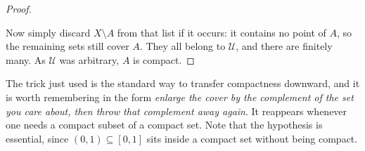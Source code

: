 \begin{proof}
\begin{center}
\end{center}

Now simply discard $X\setminus A$ from that list if it occurs: it contains no point of $A$, so
the remaining sets still cover $A$. They all belong to $\mathcal{U}$, and there are finitely
many. As $\mathcal{U}$ was arbitrary, $A$ is compact.
\end{proof}

\begin{remark}
The trick just used is the standard way to transfer compactness downward, and it is worth
remembering in the form \emph{enlarge the cover by the complement of the set you care about, then
throw that complement away again}. It reappears whenever one needs a compact subset of a compact
set. Note that the hypothesis  is essential, since $(0,1) \subseteq [0,1]$ sits inside
a compact set without being compact.
\end{remark}

